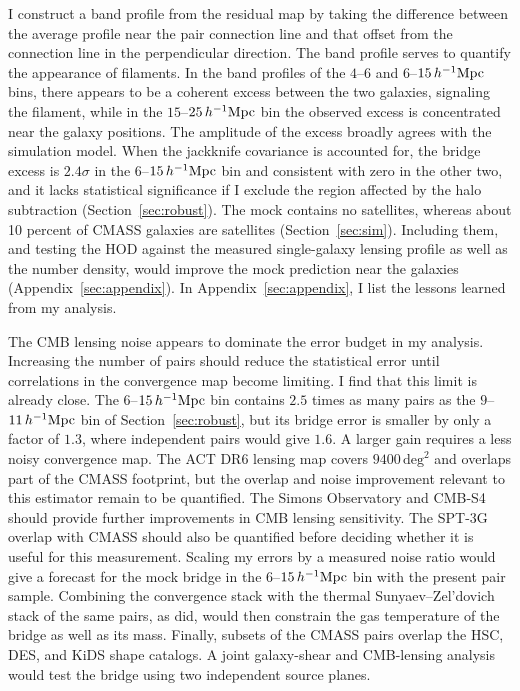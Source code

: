 \documentclass[11pt,letterpaper]{article}
\newcommand{\hinvMpc}{h^{-1}{\rm Mpc}}
\begin{document}
I construct a band profile from the residual map by taking the difference between the average profile near the pair connection line and that offset from the connection line in the perpendicular direction. The band profile serves to quantify the appearance of filaments. In the band profiles of the $4$--$6$ and $6$--$15\,\hinvMpc$ bins, there appears to be a coherent excess between the two galaxies, signaling the filament, while in the $15$--$25\,\hinvMpc$ bin the observed excess is concentrated near the galaxy positions. The amplitude of the excess broadly agrees with the simulation model. When the jackknife covariance is accounted for, the bridge excess is $2.4\sigma$ in the $6$--$15\,\hinvMpc$ bin and consistent with zero in the other two, and it lacks statistical significance if I exclude the region affected by the halo subtraction (Section~\ref{sec:robust}). The mock contains no satellites, whereas about 10 percent of CMASS galaxies are satellites (Section~\ref{sec:sim}). Including them, and testing the HOD against the measured single-galaxy lensing profile as well as the number density, would improve the mock prediction near the galaxies (Appendix~\ref{sec:appendix}). In Appendix~\ref{sec:appendix}, I list the lessons learned from my analysis.

The CMB lensing noise appears to dominate the error budget in my analysis.
Increasing the number of pairs
should reduce the statistical error until correlations in the convergence
map become limiting. I find that this limit is already close. The
$6$--$15\,\hinvMpc$ bin contains $2.5$ times as many pairs as the
$9$--$11\,\hinvMpc$ bin of Section~\ref{sec:robust}, but its bridge error is
smaller by only a factor of $1.3$, where independent pairs would give $1.6$.
A larger gain requires a less noisy convergence map. The ACT DR6 lensing map covers
$9400\,\mathrm{deg}^{2}$ and overlaps part of the CMASS footprint, but the
overlap and noise improvement relevant to this estimator remain to be
quantified. %
The Simons Observatory and CMB-S4 should provide further improvements in CMB
lensing sensitivity. %
The SPT-3G overlap with CMASS should also be quantified before deciding
whether it is useful for this measurement. Scaling my errors by a measured
noise ratio would give a forecast for the mock bridge in the $6$--$15\,\hinvMpc$ bin with
the present pair sample. %
Combining the convergence stack with the
thermal Sunyaev--Zel'dovich stack of the same pairs, as \citet{deGraaff2019}
did, would then constrain the gas temperature of the bridge as well as its
mass. Finally, subsets of the CMASS pairs overlap the HSC, DES, and KiDS shape
catalogs. A joint galaxy-shear and CMB-lensing analysis would test the bridge
using two independent source planes. %
\end{document}
